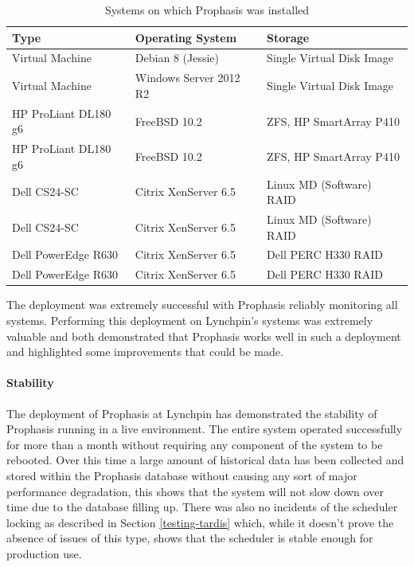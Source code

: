 \documentclass[bsc,logo,twoside,parskip,singlespacing,notimes]{infthesis}
\begin{document}
\begin{table}[H]
	\centering
	\caption{Systems on which Prophasis was installed}
	\label{table-lypn-hosts}
    \begin{tabular}{|l|l|l|}
    \hline
    \textbf{Type} & \textbf{Operating System} & \textbf{Storage} \\ \hline
    Virtual Machine & Debian 8 (Jessie) & Single Virtual Disk Image \\
    Virtual Machine & Windows Server 2012 R2 & Single Virtual Disk Image \\
    HP ProLiant DL180 g6 & FreeBSD 10.2 & ZFS, HP SmartArray P410 \\
    HP ProLiant DL180 g6 & FreeBSD 10.2 & ZFS, HP SmartArray P410 \\
    Dell CS24-SC & Citrix XenServer 6.5 & Linux MD (Software) RAID \\
    Dell CS24-SC & Citrix XenServer 6.5 & Linux MD (Software) RAID \\
    Dell PowerEdge R630 & Citrix XenServer 6.5 & Dell PERC H330 RAID \\
    Dell PowerEdge R630 & Citrix XenServer 6.5 & Dell PERC H330 RAID \\ \hline
    \end{tabular}
\end{table}


	The deployment was extremely successful with Prophasis reliably monitoring all
	systems.  Performing this deployment on Lynchpin's systems was extremely
	valuable and both demonstrated that Prophasis works well in such a deployment
	and highlighted some improvements that could be made.

\paragraph*{Stability}
	The deployment of Prophasis at Lynchpin has demonstrated the stability of
	Prophasis running in a live environment.  The entire system operated
	successfully for more than a month without requiring any component of the
	system to be rebooted.  Over this time a large amount of historical data has
	been collected and stored within the Prophasis database without causing any
	sort of major performance degradation, this shows that the system will not slow
	down over time due to the database filling up.  There was also no incidents of
	the scheduler locking as described in Section \ref{testing-tardis} which,
	while it doesn't prove the absence of issues of this type, shows that the
	scheduler is stable enough for production use.
\end{document}
